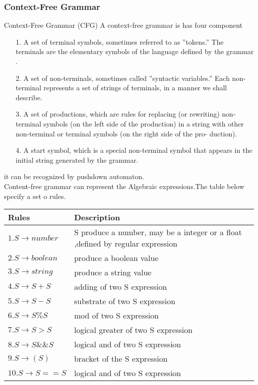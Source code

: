 \subsubsection{Context-Free Grammar}
Context-Free Grammar (CFG)
A context-free grammar is has four component
\begin{itemize}
\item [1.] A set of terminal symbols, sometimes referred to as ”tokens.” The
terminals are the elementary symbols of the language defined by the
grammar .
\item [2.] A set of non-terminals, sometimes called ”syntactic variables.” Each
non- terminal represents a set of strings of terminals, in a manner we
shall describe.
\item [3.] A set of productions, which are rules for replacing (or rewriting) non-
terminal symbols (on the left side of the production) in a string with
other non-terminal or terminal symbols (on the right side of the pro-
duction).
\item [4.] A start symbol, which is a special non-terminal symbol that appears in the initial string generated by the grammar.
\end{itemize}
\cite{aho1986compilers} it can be recognized by pushdown automaton.\\

Content-free grammar can represent the Algebraic expressions.The table below specify a set o rules. 

\begin{tabular}{|p{6cm}|p{6cm}|}
\hline \textbf{Rules} & \textbf{Description}\\ 
\hline  $1. S \rightarrow number $ & S produce a number, may be a integer or a float ,defined by regular expression  \\ 
\hline  $2.  S \rightarrow boolean $ &  produce a boolean value \\ 
\hline  $3. S \rightarrow string $&  produce a string value \\ 
\hline  $4.S \rightarrow S+S $&  adding of two S expression\\ 
\hline  $5.S \rightarrow S-S $ &  substrate of two S expression\\
\hline $6.S\rightarrow S \%S $ & mod of two S expression \\
\hline $7. S\rightarrow S > S $ &  logical greater  of two S expression\\
\hline $8.S \rightarrow S \&\& S $ & logical and of two S expression \\
\hline $9.S \rightarrow ( S) $ &  bracket of the S expression\\
\hline $10.S \rightarrow S == S $ & logical and of two S expression \\
\hline 
\end{tabular} 

